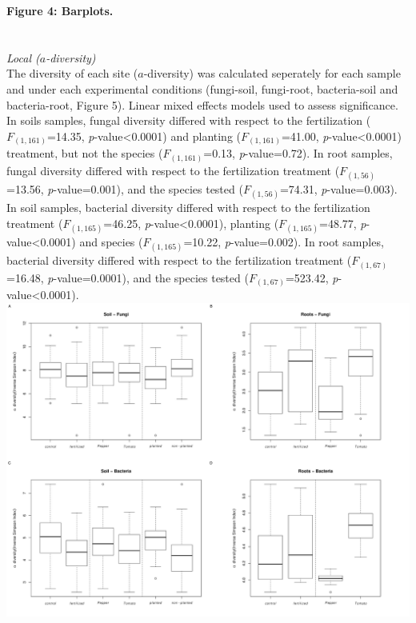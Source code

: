 \documentclass[11pt,]{article}
\begin{document}
\textbf{Figure 4: Barplots.}\\
\hspace*{0.333em}\\
\hspace*{0.333em}\\
\emph{Local (\(a\)-diversity)}\\
The diversity of each site (\(a\)-diversity) was calculated seperately
for each sample and under each experimental conditions (fungi-soil,
fungi-root, bacteria-soil and bacteria-root, Figure 5). Linear mixed
effects models used to assess significance. In soils samples, fungal
diversity differed with respect to the fertilization
(\(F_{(1,161)}\)=14.35, \emph{p}-value\textless{}0.0001) and planting
(\(F_{(1,161)}\)=41.00, \emph{p}-value\textless{}0.0001) treatment, but
not the species (\(F_{(1,161)}\)=0.13, \emph{p}-value=0.72). In root
samples, fungal diversity differed with respect to the fertilization
treatment (\(F_{(1,56)}\)=13.56, \emph{p}-value=0.001), and the species
tested (\(F_{(1,56)}\)=74.31, \emph{p}-value=0.003). In soil samples,
bacterial diversity differed with respect to the fertilization treatment
(\(F_{(1,165)}\)=46.25, \emph{p}-value\textless{}0.0001), planting
(\(F_{(1,165)}\)=48.77, \emph{p}-value\textless{}0.0001) and species
(\(F_{(1,165)}\)=10.22, \emph{p}-value=0.002). In root samples,
bacterial diversity differed with respect to the fertilization treatment
(\(F_{(1,67)}\)=16.48, \emph{p}-value=0.0001), and the species tested
(\(F_{(1,67)}\)=523.42, \emph{p}-value\textless{}0.0001). ~\\
\includegraphics[width=6.25000in]{../figures/Figure5_alpha.pdf}\\
\end{document}
